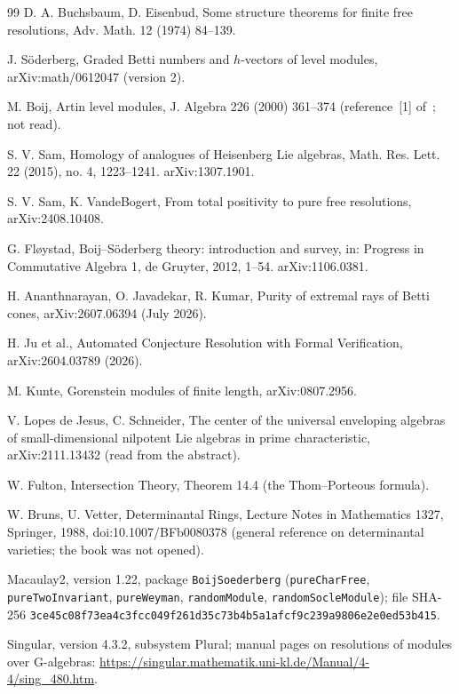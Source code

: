 \documentclass[11pt]{article}
\theoremstyle{definition}
\theoremstyle{remark}
\begin{document}
\begin{thebibliography}{99}
 D. A. Buchsbaum, D. Eisenbud, Some structure theorems for finite free resolutions, Adv. Math. 12 (1974) 84--139.

 J. S\"oderberg, Graded Betti numbers and $h$-vectors of level modules, arXiv:math/0612047 (version 2).

 M. Boij, Artin level modules, J. Algebra 226 (2000) 361--374 (reference~[1] of~\cite{SodLevel}; not read).

 S. V. Sam, Homology of analogues of Heisenberg Lie algebras, Math. Res. Lett. 22 (2015), no. 4, 1223--1241. arXiv:1307.1901.

 S. V. Sam, K. VandeBogert, From total positivity to pure free resolutions, arXiv:2408.10408.

 G. Fl{\o}ystad, Boij--S\"oderberg theory: introduction and survey, in: Progress in Commutative Algebra 1, de Gruyter, 2012, 1--54. arXiv:1106.0381.

 H. Ananthnarayan, O. Javadekar, R. Kumar, Purity of extremal rays of Betti cones, arXiv:2607.06394 (July 2026).

 H. Ju et al., Automated Conjecture Resolution with Formal Verification, arXiv:2604.03789 (2026).

 M. Kunte, Gorenstein modules of finite length, arXiv:0807.2956.

 V. Lopes de Jesus, C. Schneider, The center of the universal enveloping algebras of small-dimensional nilpotent Lie algebras in prime characteristic, arXiv:2111.13432 (read from the abstract).

 W. Fulton, Intersection Theory, Theorem 14.4 (the Thom--Porteous formula).

 W. Bruns, U. Vetter, Determinantal Rings, Lecture Notes in Mathematics 1327, Springer, 1988, doi:10.1007/BFb0080378 (general reference on determinantal varieties; the book was not opened).

 Macaulay2, version 1.22, package \texttt{BoijSoederberg} (\texttt{pureCharFree}, \texttt{pureTwoInvariant}, \texttt{pureWeyman}, \texttt{randomModule}, \texttt{randomSocleModule}); file SHA-256 \texttt{3ce45c08f73ea4c3fcc049f261d35c73b4b5a1afcf9c239a9806e2e0ed53b415}.

 Singular, version 4.3.2, subsystem Plural; manual pages on resolutions of modules over G-algebras: \url{https://singular.mathematik.uni-kl.de/Manual/4-4/sing_480.htm}.


\end{thebibliography}
\end{document}
